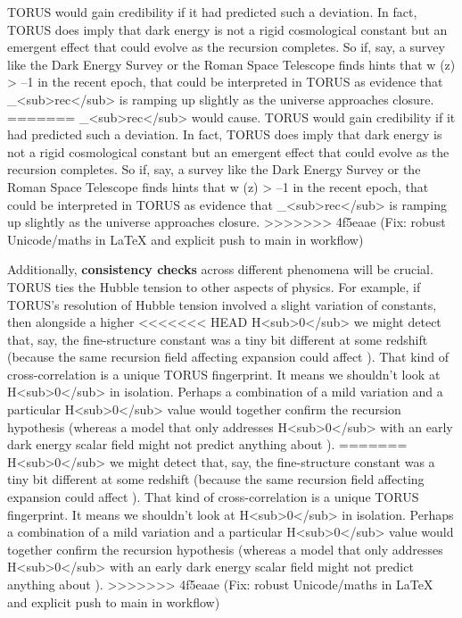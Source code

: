 \documentclass[]{article}
\begin{document}
TORUS would gain credibility if it had predicted such a deviation. In
fact, TORUS does imply that dark energy is not a rigid cosmological
constant but an emergent effect that could evolve as the recursion
completes\hspace{0pt}. So if, say, a survey like the Dark Energy Survey
or the Roman Space Telescope finds hints that w (z) \textgreater{} --1
in the recent epoch, that could be interpreted in TORUS as evidence that
\Lambda\_\textless sub\textgreater rec\textless/sub\textgreater{} is ramping
up slightly as the universe approaches closure.
=======
\Lambda\_\textless{}sub\textgreater{}rec\textless{}/sub\textgreater{} would
cause. TORUS would gain credibility if it had predicted such a
deviation. In fact, TORUS does imply that dark energy is not a rigid
cosmological constant but an emergent effect that could evolve as the
recursion completes​. So if, say, a survey like the Dark Energy Survey
or the Roman Space Telescope finds hints that w (z) \textgreater{} --1
in the recent epoch, that could be interpreted in TORUS as evidence that
\Lambda\_\textless{}sub\textgreater{}rec\textless{}/sub\textgreater{} is
ramping up slightly as the universe approaches closure.
>>>>>>> 4f5eaae (Fix: robust Unicode/maths in LaTeX and explicit push to main in workflow)

Additionally, \textbf{consistency checks} across different phenomena
will be crucial. TORUS ties the Hubble tension to other aspects of
physics. For example, if TORUS's resolution of Hubble tension involved a
slight variation of constants, then alongside a higher
<<<<<<< HEAD
H\textless sub\textgreater0\textless/sub\textgreater{} we might detect
that, say, the fine-structure constant was a tiny bit different at some
redshift (because the same recursion field affecting expansion could
affect \alpha). That kind of cross-correlation is a unique TORUS fingerprint.
It means we shouldn't look at
H\textless sub\textgreater0\textless/sub\textgreater{} in isolation.
Perhaps a combination of a mild \alpha variation and a particular
H\textless sub\textgreater0\textless/sub\textgreater{} value would
together confirm the recursion hypothesis (whereas a model that only
addresses H\textless sub\textgreater0\textless/sub\textgreater{} with an
early dark energy scalar field might not predict anything about \alpha).
=======
H\textless{}sub\textgreater{}0\textless{}/sub\textgreater{} we might
detect that, say, the fine-structure constant was a tiny bit different
at some redshift (because the same recursion field affecting expansion
could affect \alpha). That kind of cross-correlation is a unique TORUS
fingerprint. It means we shouldn't look at
H\textless{}sub\textgreater{}0\textless{}/sub\textgreater{} in
isolation. Perhaps a combination of a mild \alpha variation and a particular
H\textless{}sub\textgreater{}0\textless{}/sub\textgreater{} value would
together confirm the recursion hypothesis (whereas a model that only
addresses H\textless{}sub\textgreater{}0\textless{}/sub\textgreater{}
with an early dark energy scalar field might not predict anything about
\alpha).
>>>>>>> 4f5eaae (Fix: robust Unicode/maths in LaTeX and explicit push to main in workflow)
\end{document}
